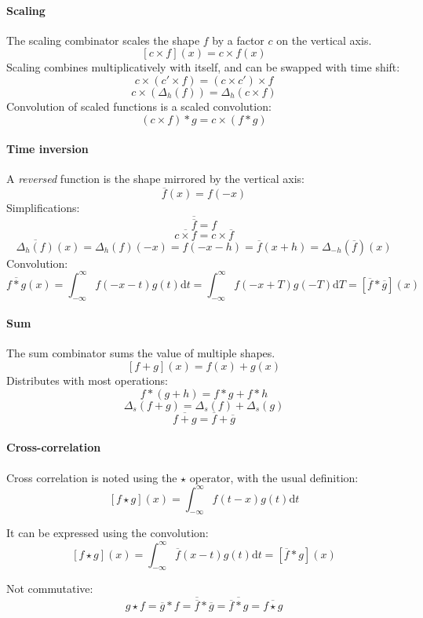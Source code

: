 \documentclass[a4paper,10pt]{article}
\newcommand\Shifted[2]{\Delta_{#1}(#2)}
\newcommand\Reversed[1]{\overline{#1}} %
\newcommand\D{\mathrm{d}}
\newcommand\Convolution{\ast}
\newcommand\Correlation{\star}
\newcommand\IntR[2]{\int_{-\infty}^{\infty}#1 \D#2}
\begin{document}
\paragraph{Scaling}
The scaling combinator scales the shape $f$ by a factor $c$ on the vertical axis.
\[ \left[ c \times f \right] (x) = c \times f(x) \]
Scaling combines multiplicatively with itself, and can be swapped with time shift:
\[ c \times (c' \times f) =  (c \times c') \times f \]
\[ c \times (\Shifted{h}{f}) = \Shifted{h}{c \times f} \]
Convolution of scaled functions is a scaled convolution:
\[ (c \times f) \Convolution g = c \times (f \Convolution g) \]

\paragraph{Time inversion}
A \emph{reversed} function is the shape mirrored by the vertical axis:
\[ \Reversed{f}(x) = f(-x) \]
Simplifications:
\[ \Reversed{\Reversed{f}} = f \]
\[ \Reversed{c \times f} = c \times \Reversed{f} \]
\[ \Reversed{\Shifted{h}{f}}(x) = \Shifted{h}{f}(-x) = f(-x-h) = \Reversed{f}(x+h) = \Shifted{-h}{\Reversed{f}}(x) \]
Convolution:
\[
    \Reversed{f \Convolution g}(x) = \IntR{f(-x-t) g(t)}{t} = \IntR{f(-x+T) g(-T)}{T} = \left[ \Reversed{f} \Convolution \Reversed{g} \right] (x)
\]

\paragraph{Sum}
The sum combinator sums the value of multiple shapes.
\[ [f+g](x) = f(x) + g(x) \]
Distributes with most operations:
\[ f \Convolution (g + h) = f \Convolution g + f \Convolution h \]
\[ \Shifted{s}{f + g} = \Shifted{s}{f} + \Shifted{s}{g} \]
\[ \Reversed{f + g} = \Reversed{f} + \Reversed{g} \]

\paragraph{Cross-correlation}
Cross correlation is noted using the $\Correlation$ operator, with the usual definition:
\[ \left[ f \Correlation g \right] (x) = \IntR{f(t-x) g(t)}{t} \]

It can be expressed using the convolution:
\[ \left[ f \Correlation g \right] (x) = \IntR{\Reversed{f}(x-t) g(t)}{t} = \left[ \Reversed{f} \Convolution g \right] (x) \]

Not commutative:
\[
    g \Correlation f = \Reversed{g} \Convolution f = \Reversed{\Reversed{f}} \Convolution \Reversed{g} =
    \Reversed{\Reversed{f} \Convolution g} = \Reversed{f \Correlation g}
\]
\end{document}
